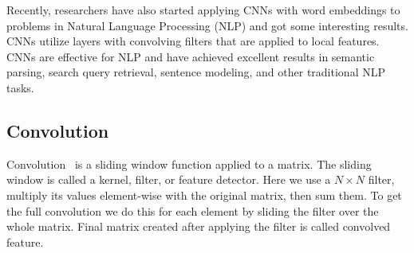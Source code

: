 Recently, researchers have also started applying CNNs with word embeddings to problems in Natural Language Processing (NLP) and got some interesting results. CNNs utilize layers with convolving filters that are applied to local features. CNNs are effective for NLP and have achieved excellent results in semantic parsing, search query retrieval, sentence modeling, and other traditional NLP tasks.

\subsection{Convolution}
%


Convolution~\cite{hu} is a sliding window function applied to a matrix. The sliding window is called a kernel, filter, or feature detector. Here we use a $N\times N$ filter, multiply its values element-wise with the original matrix, then sum them. To get the full convolution we do this for each element by sliding the filter over the whole matrix. Final matrix created after applying the filter is called convolved feature. 


